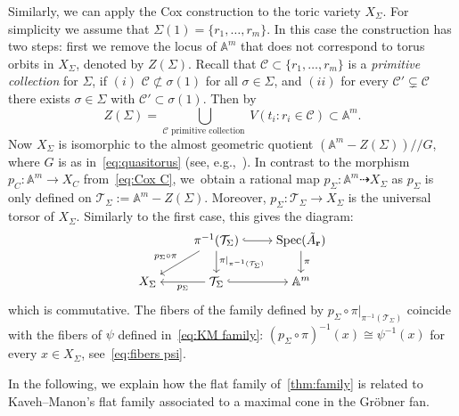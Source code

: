 \documentclass[10pt,a4paper]{amsart}
\newcommand{\thref}[1]{\ref{#1}}
\numberwithin{equation}{section}
\begin{document}
Similarly, we can apply the Cox construction to the toric variety $X_\Sigma$. For simplicity we assume that $\Sigma(1)=\{{r}_1,\dots,{r}_{m}\}$.
 In this case the construction has two steps: first we remove the locus of $\mathbb A^m$ that does not correspond to torus orbits in $X_{\Sigma}$, denoted by $Z(\Sigma)$.
 Recall that $\mathcal C\subset \{{r}_1,\dots,{r}_m\}$ is a {\it primitive collection} for $\Sigma$, if $(i)$ $\mathcal C\not\subset \sigma(1)$ for all $\sigma\in \Sigma$, and $(ii)$ for every $\mathcal C'\subsetneq \mathcal C$ there exists $\sigma\in \Sigma$ with $\mathcal C'\subset \sigma(1)$.
 Then by~\cite[Proposition 5.1.6]{CLS}
 \begin{equation}\label{eq:Z(Sigma)}
 Z(\Sigma)=\bigcup_{\mathcal C \text{ primitive collection }} V(t_i\colon r_i\in \mathcal C) \subset \mathbb A^m.
 \end{equation}
 Now $X_{\Sigma}$ is isomorphic to the almost geometric quotient $(\mathbb A^m-Z(\Sigma))/\!/G$, where $G$ is as in~\eqref{eq:quasitorus} (see, e.g.,~\cite[Theorem~5.1.11]{CLS}).
 In contrast to the morphism $p_C\colon \mathbb A^m\to X_C$ from~\eqref{eq:Cox C}, we~obtain a rational map $p_\Sigma\colon \mathbb A^m\dashrightarrow X_\Sigma$ as $p_\Sigma$ is only defined on $\mathcal T_\Sigma:=\mathbb A^m-Z(\Sigma)$.
 Moreover, $p_\Sigma\colon \mathcal T_\Sigma\to X_\Sigma$ is the universal torsor of $X_\Sigma$.
 Similarly to the first case, this gives the diagram:
 \begin{equation}\label{eq:Cox Sigma}
 \begin{tikzcd}[ampersand replacement=\&,cramped]
 \& \pi^{-1}(\mathcal T_\Sigma)\ar[d,"\pi\vert_{\pi^{-1}(\mathcal T_\Sigma)}"] \ar[dl,"p_\Sigma\circ \pi"']\ar[r,hook] \& \operatorname{Spec}(\tilde A_{\bf r})\ar[d,"\pi"] \\
 X_{\Sigma} \& \mathcal T_\Sigma \ar[l,"p_\Sigma"]\ar[r,hook]\& \mathbb A^m
 \end{tikzcd}
 \end{equation}
 which is commutative. The fibers of the family defined by $p_\Sigma\circ \pi\vert_{\pi^{-1}(\mathcal T_\Sigma)}$ coincide with the fibers of $\psi$ defined in~\eqref{eq:KM family}: $(p_\Sigma\circ \pi)^{-1}(x)\cong \psi^{-1}(x)$ for every $x\in X_\Sigma$, see~\eqref{eq:fibers psi}.




In the following, we explain how the flat family of~\thref{thm:family} is related to Kaveh--Manon's flat family associated to a maximal cone in the Gr\"obner fan.
\end{document}
